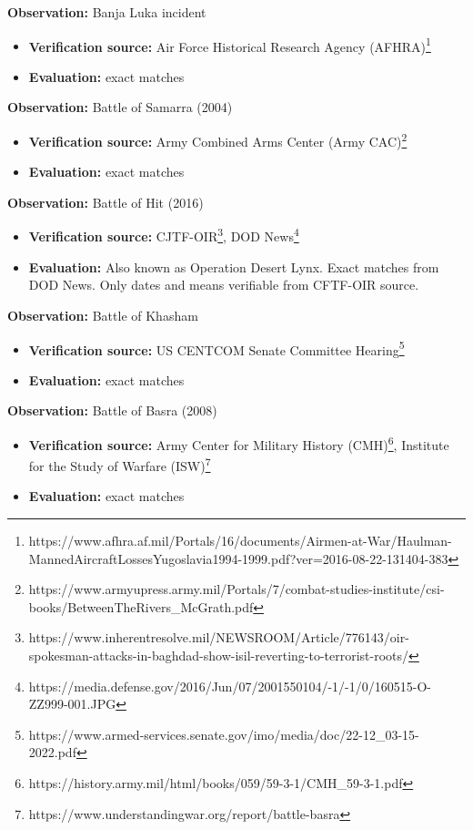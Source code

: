 \documentclass[fleqn,12pt]{article}
\begin{document}
\textbf{Observation:} Banja Luka incident
\begin{itemize}
    \item \textbf{Verification source:} Air Force Historical Research Agency (AFHRA)\footnote{https://www.afhra.af.mil/Portals/16/documents/Airmen-at-War/Haulman-MannedAircraftLossesYugoslavia1994-1999.pdf?ver=2016-08-22-131404-383}
    \item \textbf{Evaluation:} exact matches
\end{itemize}

\textbf{Observation:} Battle of Samarra (2004)
\begin{itemize}
    \item \textbf{Verification source:} Army Combined Arms Center (Army CAC)\footnote{https://www.armyupress.army.mil/Portals/7/combat-studies-institute/csi-books/BetweenTheRivers_McGrath.pdf}
    \item \textbf{Evaluation:} exact matches
\end{itemize}

\textbf{Observation:} Battle of Hit (2016)
\begin{itemize}
    \item \textbf{Verification source:} CJTF-OIR\footnote{https://www.inherentresolve.mil/NEWSROOM/Article/776143/oir-spokesman-attacks-in-baghdad-show-isil-reverting-to-terrorist-roots/}, DOD News\footnote{https://media.defense.gov/2016/Jun/07/2001550104/-1/-1/0/160515-O-ZZ999-001.JPG}
    \item \textbf{Evaluation:} Also known as Operation Desert Lynx. Exact matches from DOD News. Only dates and means verifiable from CFTF-OIR source.
\end{itemize}

\textbf{Observation:} Battle of Khasham
\begin{itemize}
    \item \textbf{Verification source:} US CENTCOM Senate Committee Hearing\footnote{https://www.armed-services.senate.gov/imo/media/doc/22-12_03-15-2022.pdf}
    \item \textbf{Evaluation:} exact matches
\end{itemize}

\textbf{Observation:} Battle of Basra (2008)
\begin{itemize}
    \item \textbf{Verification source:} Army Center for Military History (CMH)\footnote{https://history.army.mil/html/books/059/59-3-1/CMH_59-3-1.pdf}, Institute for the Study of Warfare (ISW)\footnote{https://www.understandingwar.org/report/battle-basra}
    \item \textbf{Evaluation:} exact matches
\end{itemize}
\end{document}
